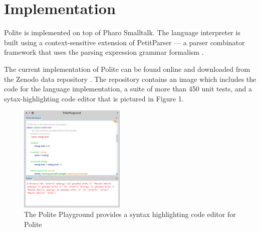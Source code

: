 

\section{Implementation}
Polite is implemented on top of Pharo Smalltalk. The language interpreter is built using a context-sensitive extension of PetitParser --- a parser combinator framework that uses the parsing expression grammar formalism \cite{Kurs14a-ParsingContext}. 

The current implementation of Polite can be found online and downloaded from  the Zenodo data repository \cite{kurs16-polite}. The repository contains an image which includes the code for the language implementation, a suite of more than 450 unit tests, and a sytax-highlighting code editor that is pictured in Figure 1. 

\begin{figure}[h]
	\centering
	\includegraphics[width=0.45\textwidth]{images/playground.png}
	\caption{The Polite Playground provides a syntax highlighting code editor for Polite}
	\label{fig:figure1}
\end{figure}